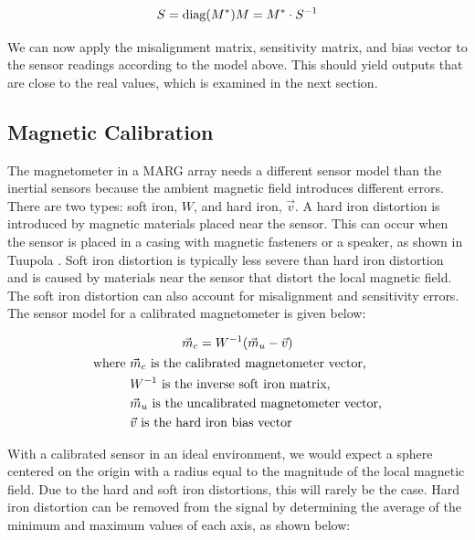 \begin{equation} \labeq{sensitivity_and_misalignment}
    S = \text{diag}(M^*) \\
    M = M^* \cdot S^{-1}
\end{equation}

We can now apply the misalignment matrix, sensitivity matrix, and bias vector to the sensor readings according to the model above. This should yield outputs that are close to the real values, which is examined in the next section.

\subsection{Magnetic Calibration}
The magnetometer in a MARG array needs a different sensor model than the inertial sensors because the ambient magnetic field introduces different errors. 
There are two types: soft iron, $W$, and hard iron, $\vec{v}$. 
A hard iron distortion is introduced by magnetic materials placed near the sensor. 
This can occur when the sensor is placed in a casing with magnetic fasteners or a speaker, as shown in Tuupola \cite{Tuupola:2018}. 
Soft iron distortion is typically less severe than hard iron distortion and is caused by materials near the sensor that distort the local magnetic field. 
The soft iron distortion can also account for misalignment and sensitivity errors. 
The sensor model for a calibrated magnetometer is given below:

\begin{gather} \labeq{magnetic_model}
    \vec{m}_c=W^{-1}(\vec{m}_u-\vec{v}) \\
    \begin{aligned}
        \text{where } &\vec{m}_c \text{ is the calibrated magnetometer vector,} \\
        &W^{-1} \text{ is the inverse soft iron matrix,}\\
        &\vec{m}_u \text{ is the uncalibrated magnetometer vector,} \\
        &\vec{v} \text{ is the hard iron bias vector}
    \end{aligned} \notag
\end{gather}

With a calibrated sensor in an ideal environment, we would expect a sphere centered on the origin with a radius equal to the magnitude of the local magnetic field. 
Due to the hard and soft iron distortions, this will rarely be the case. 
Hard iron distortion can be removed from the signal by determining the average of the minimum and maximum values of each axis, as shown below:

